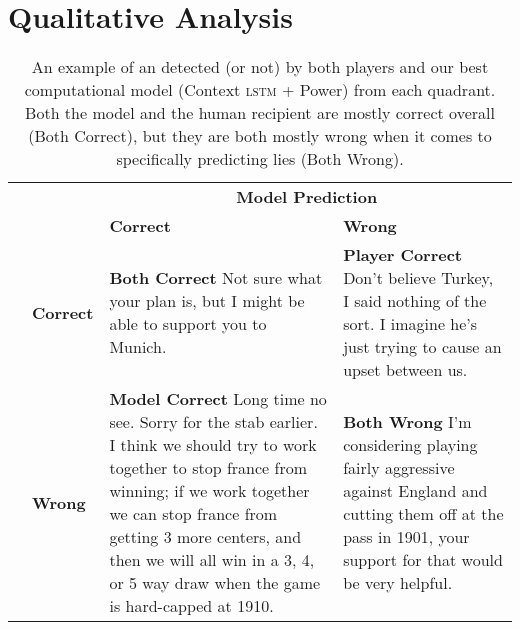 \section{Qualitative Analysis}
\label{sec:analysis}


\begin{table*}[t]
	\small
	\begin{tabularx}{\textwidth}{r  l   X X}
		& &\multicolumn{2}{c}{\textbf{Model Prediction}} \\
		
		& &  \textbf{Correct }&  \textbf{Wrong} \\
		\toprule
		\multirow{2}{*}{ \rotatebox[origin=r]{90}{\textbf{Player Prediction}}} & \textbf{Correct}
		& \cellcolor{gray!25}\textbf{Both Correct}
		Not sure what your plan is, but I might be able to support you to Munich.
		& \textbf{Player Correct}
		Don't believe Turkey, I said nothing of the sort. I imagine he's just trying to cause an upset between us. 
		\\
		& \textbf{Wrong}
		& \textbf{Model Correct}
		Long time no see. Sorry for the stab earlier. I think we should try to work together to stop france from winning; if we work together we can stop france from getting 3 more centers, and then we will all win in a 3, 4, or 5 way draw when the game is hard-capped at 1910.
		&  \cellcolor{gray!25}\textbf{Both Wrong}
		I'm considering playing fairly aggressive against England and cutting them off at the pass in 1901, your support for that would be very helpful.
		\\
                \bottomrule
	\end{tabularx}
	\caption{An example of an  \alie{} detected (or not) by both players and our best computational model (Context \textsc{lstm} + Power) from each quadrant.  Both the model and the human recipient are mostly correct overall (Both Correct), but they are both mostly wrong when it comes to specifically predicting lies (Both Wrong).}
	\label{tab:predictionquadrant}
\end{table*}


